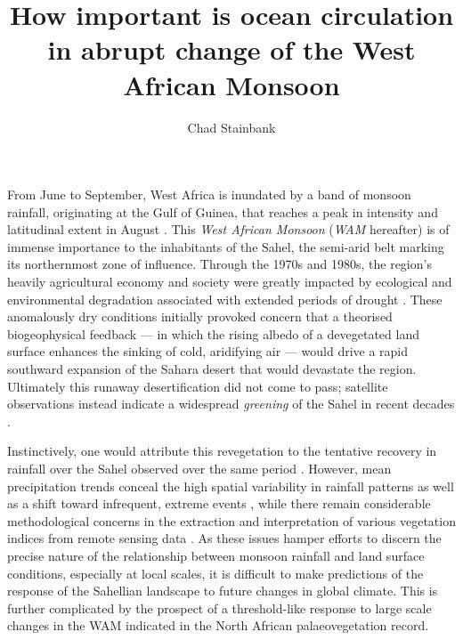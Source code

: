 \documentclass[a4paper]{article}
\begin{document}
\title{How important is ocean circulation in abrupt change of the West African Monsoon}
\author{Chad Stainbank}
\maketitle

From June to September, West Africa is inundated by a band of monsoon rainfall, originating at the Gulf of Guinea, that reaches a peak in intensity and latitudinal extent in August \parencite{sultan2003west}.
This \emph{West African Monsoon} (\emph{WAM} hereafter) is of immense importance to the inhabitants of the Sahel, the semi-arid belt marking its northernmost zone of influence.
Through the 1970s and 1980s, the region's heavily agricultural economy and society were greatly impacted by ecological and environmental degradation associated with extended periods of drought \parencite{benson1998impact, olsson1993causes, walther2016review}.
These anomalously dry conditions initially provoked concern that a theorised biogeophysical feedback --- in which the rising albedo of a devegetated land surface enhances the sinking of cold, aridifying air \parencite{charney1975dynamics, charney1975drought} --- would drive a rapid southward expansion of the Sahara desert that would devastate the region.
Ultimately this runaway desertification did not come to pass; satellite observations instead indicate a widespread \emph{greening} of the Sahel in recent decades \parencite{olsson2005recent, dardel2014re}.

Instinctively, one would attribute this revegetation to the tentative recovery in rainfall over the Sahel observed over the same period \parencite{lebel2009recent}.
However, mean precipitation trends conceal the high spatial variability in rainfall patterns as well as a shift toward infrequent, extreme events \parencite{nicholson2013west, panthou2014recent}, while there remain considerable methodological concerns in the extraction and interpretation of various vegetation indices from remote sensing data \parencite{fensholt2013assessing, dardel2014rain}.
As these issues hamper efforts to discern the precise nature of the relationship between monsoon rainfall and land surface conditions, especially at local scales, it is difficult to make predictions of the response of the Sahellian landscape to future changes in global climate.
This is further complicated by the prospect of a threshold-like response to large scale changes in the WAM indicated in the North African palaeovegetation record.




\printbibliography{}
\end{document}
